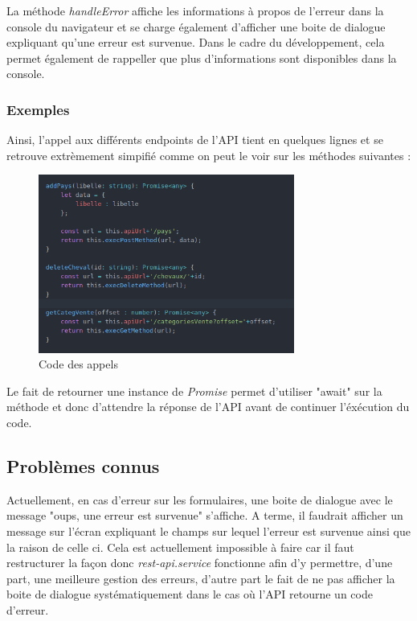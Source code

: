 				La méthode \textit{handleError} affiche les informations à propos de l'erreur dans la console du navigateur et se charge également d'afficher une boite de dialogue expliquant qu'une erreur est survenue. Dans le cadre du développement, cela permet également de rappeller que plus d'informations sont disponibles dans la console.

			\subsubsection{Exemples}

			Ainsi, l'appel aux différents endpoints de l'API tient en quelques lignes et se retrouve extrèmement simpifié comme on peut le voir sur les méthodes suivantes :

				\begin{figure}[H]
					\centering\includegraphics[width=0.75\textwidth, keepaspectratio]{res/ionic-rest-add-delete-get.png}
					\caption{Code des appels}
				\end{figure}

			Le fait de retourner une instance de \textit{Promise} permet d'utiliser "await" sur la méthode et donc d'attendre la réponse de l'API avant de continuer l'éxécution du code.

		\subsection{Problèmes connus}


			Actuellement, en cas d'erreur sur les formulaires, une boite de dialogue avec le message "oups, une erreur est survenue" s'affiche. A terme, il faudrait afficher un message sur l'écran expliquant le champs sur lequel l'erreur est survenue ainsi que la raison de celle ci. Cela est actuellement impossible à faire car il faut restructurer la façon donc \textit{rest-api.service} fonctionne afin d'y permettre, d'une part, une meilleure gestion des erreurs, d'autre part le fait de ne pas afficher la boite de dialogue systématiquement dans le cas où l'API retourne un code d'erreur.
